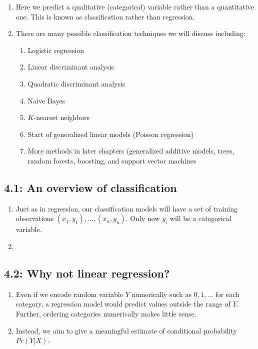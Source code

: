 \documentclass{article}
\begin{document}
\begin{enumerate}
\item Here we predict a qualitative (categorical) variable rather than a quantitative one. This is known as classification rather than regression.
\item There are many possible classification techniques we will discuss including:
\begin{enumerate}
\item Logistic regression
\item Linear discriminant analysis
\item Quadratic discriminant analysis
\item Naive Bayes
\item $K$-nearest neighbors
\item Start of generalized linear models (Poisson regression)
\item More methods in later chapters (generalized additive models, trees, random forests, boosting, and support vector machines
\end{enumerate}
\end{enumerate}

\subsection*{4.1: An overview of classification}

\begin{enumerate}
\item Just as in regression, our classification models will have a set of training observations $(x_1, y_1), \dots, (x_n, y_n)$. Only now $y_i$ will be a categorical variable.
\item 
\end{enumerate}

\subsection*{4.2: Why not linear regression?}

\begin{enumerate}
\item Even if we encode random variable $Y$ numerically such as $0,1,\dots$ for each category, a regression model would predict values outside the range of $Y$. Further, ordering categories numerically makes little sense.
\item Instead, we aim to give a meaningful estimate of conditional probability $Pr(Y | X)$.
\end{enumerate}
\end{document}
